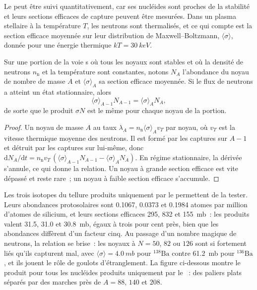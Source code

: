 Le  peut être suivi quantitativement, car ses nucléides sont
proches de la stabilité et leurs sections efficaces de capture peuvent être mesurées. Dans un
plasma stellaire à la température $T$, les neutrons sont thermalisés, et ce qui
compte est la section efficace moyennée sur leur distribution de Maxwell--Boltzmann,
$\langle\sigma\rangle$, donnée pour une énergie thermique
$kT = \qty{30}{keV}$.

\begin{proposition}\label{prop:b3:origin-of-elements:sigma-n}
Sur une portion de la voie s où tous les noyaux sont stables et où la
densité de neutrons $n_\mathrm{n}$ et la température sont constantes, notons $N_A$
l'abondance du noyau de nombre de masse $A$ et $\langle\sigma\rangle_A$
sa section efficace moyennée. Si le flux de neutrons a atteint un
état stationnaire, alors
\[
\langle\sigma\rangle_{A-1} N_{A-1} = \langle\sigma\rangle_A N_A ,
\]
de sorte que le produit $\sigma N$ est le même pour chaque noyau de la
portion.
\end{proposition}

\begin{proof}
Un noyau de masse $A$  au taux
$\lambda_A = n_\mathrm{n}\langle\sigma\rangle_A v_T$ par noyau, où
$v_T$ est la vitesse thermique moyenne des neutrons. Il est formé par les captures sur
$A - 1$ et détruit par les captures sur lui-même, donc
$\mathrm{d}N_A/\mathrm{d}t = n_\mathrm{n} v_T\,(\langle\sigma\rangle_{A-1}
N_{A-1} - \langle\sigma\rangle_A N_A)$. En régime stationnaire, la dérivée
s'annule, ce qui donne la relation. Un noyau à grande section efficace est
vite dépassé et reste rare~; un noyau à faible section efficace
s'accumule.
\end{proof}

Les trois isotopes du tellure produits uniquement par le  permettent de la tester. Leurs abondances protosolaires
sont \num{0.1067}, \num{0.0373} et \num{0.1984} atomes par
million d'atomes de silicium, et leurs sections efficaces \num{295}, \num{832} et
\qty{155}{mb}~: les produits valent \num{31.5}, \num{31.0} et
\qty{30.8}{mb}, égaux à trois pour cent près, bien que les abondances
diffèrent d'un facteur cinq. Au passage d'un nombre magique de neutrons, la relation
se brise~: les noyaux à $N = 50$, $82$ ou $126$ sont si fortement liés qu'ils
capturent mal, avec $\langle\sigma\rangle = \qty{4.0}{mb}$ pour
$^{138}\mathrm{Ba}$ contre \qty{61.2}{mb} pour $^{136}\mathrm{Ba}$, et
ils jouent le rôle de goulots d'étranglement. La figure ci-dessous montre le produit pour tous les
nucléides produits uniquement par le ~: des paliers plats séparés par des marches près de
$A = 88$, $140$ et $208$.

